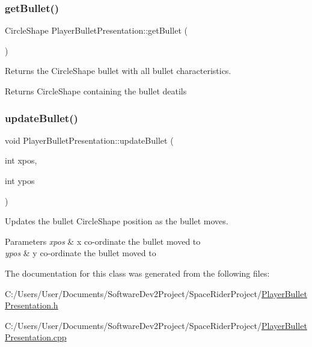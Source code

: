\subsubsection{\texorpdfstring{get\+Bullet()}{getBullet()}}
{\footnotesize\ttfamily Circle\+Shape Player\+Bullet\+Presentation\+::get\+Bullet (\begin{DoxyParamCaption}{ }\end{DoxyParamCaption})}



Returns the Circle\+Shape bullet with all bullet characteristics. 

\begin{DoxyReturn}{Returns}
Circle\+Shape containing the bullet deatils 
\end{DoxyReturn}
\mbox{\label{class_player_bullet_presentation_ad8a28adf4326c03c52af77c7b91c5a0a}} 
\subsubsection{\texorpdfstring{update\+Bullet()}{updateBullet()}}
{\footnotesize\ttfamily void Player\+Bullet\+Presentation\+::update\+Bullet (\begin{DoxyParamCaption}\item[{int}]{xpos,  }\item[{int}]{ypos }\end{DoxyParamCaption})}



Updates the bullet Circle\+Shape position as the bullet moves. 


\begin{DoxyParams}{Parameters}
{\em xpos} & x co-\/ordinate the bullet moved to \\
\hline
{\em ypos} & y co-\/ordinate the bullet moved to \\
\hline
\end{DoxyParams}


The documentation for this class was generated from the following files\+:\begin{DoxyCompactItemize}
\item 
C\+:/\+Users/\+User/\+Documents/\+Software\+Dev2\+Project/\+Space\+Rider\+Project/\hyperlink{_player_bullet_presentation_8h}{Player\+Bullet\+Presentation.\+h}\item 
C\+:/\+Users/\+User/\+Documents/\+Software\+Dev2\+Project/\+Space\+Rider\+Project/\hyperlink{_player_bullet_presentation_8cpp}{Player\+Bullet\+Presentation.\+cpp}\end{DoxyCompactItemize}
